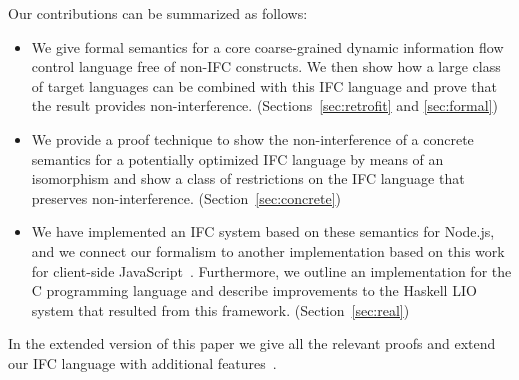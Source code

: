 \documentclass{llncs}
\newif\ifextended
\begin{document}
Our contributions can be summarized as follows:
\vspace*{-0.3em}
\begin{itemize}
  \item We give formal semantics for a core coarse-grained
  dynamic information flow control language free of non-IFC constructs.
  We then show how a large class of target languages can be combined
  with this IFC language and prove that the result provides
  non-interference. (Sections~\ref{sec:retrofit} and \ref{sec:formal})
  \item We provide a proof technique to show the non-interference
  of a concrete semantics for a potentially optimized IFC language
  by means of an isomorphism and show a class of restrictions on
  the IFC language that preserves non-interference. (Section~\ref{sec:concrete})
  \item We have implemented an IFC system based on these semantics
  for Node.js, and we connect our formalism to another implementation
  based on this work for client-side JavaScript~\cite{swapi}.
  Furthermore, we outline an implementation for the C programming
  language and describe improvements to the Haskell LIO system that
  resulted from this framework.
  (Section~\ref{sec:real})
\end{itemize}

\ifextended
\else
In the extended version of this paper we give all the relevant proofs and
extend our IFC language with additional features~\cite{extended}.
\fi
\end{document}
